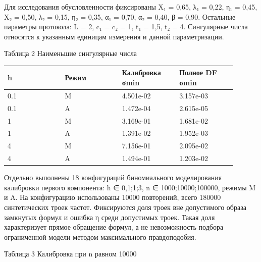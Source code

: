 \documentclass[11pt,a4paper]{article}
\begin{document}
Для исследования обусловленности фиксированы X₁ = 0,65, λ₁ = 0,22, η₁ = 0,45, X₂ = 0,50, λ₂ = 0,15, η₂ = 0,35, α₁ = 0,70, α₂ = 0,40, β = 0,90. Остальные параметры протокола: L = 2, c₁ = c₂ = 1, t₁ = 1,5, t₂ = 4. Сингулярные числа относятся к указанным единицам измерения и данной параметризации.\par

\begin{center}\small Таблица 2 Наименьшие сингулярные числа\end{center}

\begin{longtable}{|p{0.225\linewidth}|p{0.225\linewidth}|p{0.225\linewidth}|p{0.225\linewidth}|}\hline

h & Режим & Калибровка σmin & Полное DF σmin\\\hline\endhead

0.1 & M & 4.501e-02 & 3.157e-03\\\hline

0.1 & A & 1.472e-04 & 2.615e-05\\\hline

1 & M & 3.169e-01 & 1.681e-02\\\hline

1 & A & 1.391e-02 & 1.952e-03\\\hline

4 & M & 7.156e-01 & 2.095e-02\\\hline

4 & A & 1.494e-01 & 1.203e-02\\\hline

\end{longtable}

Отдельно выполнены 18 конфигураций биномиального моделирования калибровки первого компонента: h ∈ {0,1;1;3}, n ∈ {1000;10000;100000}, режимы M и A. На конфигурацию использованы 10000 повторений, всего 180000 синтетических троек частот. Фиксируются доля троек вне допустимого образа замкнутых формул и ошибка η среди допустимых троек. Такая доля характеризует прямое обращение формул, а не невозможность подбора ограниченной модели методом максимального правдоподобия.\par

\begin{center}\small Таблица 3 Калибровка при n равном 10000\end{center}
\end{document}
